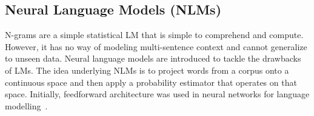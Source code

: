 \subsection{Neural Language Models (NLMs)}
N-grams are a simple statistical LM that is simple to comprehend and compute. However, it has no way of modeling multi-sentence context and cannot generalize to unseen data. 
Neural language models are introduced to tackle the drawbacks of LMs.
The idea underlying NLMs is to project words from a corpus onto a continuous space and then apply a probability estimator that operates on that space. Initially, feedforward architecture was used in neural networks for language modelling~\cite{advancesnlm}.




